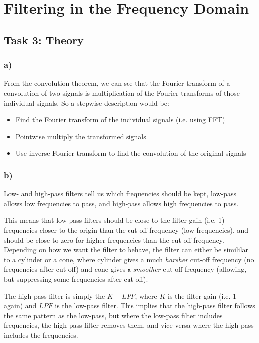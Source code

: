 \section{Filtering in the Frequency Domain}
\subsection{Task 3: Theory}
\subsubsection*{a)}
From the convolution theorem, we can see that the Fourier transform of a convolution of two signals is multiplication of the Fourier transforms of those individual signals. So a stepwise description would be: 
\begin{itemize}
    \item Find the Fourier transform of the individual signals (i.e. using FFT)
    \item Pointwise multiply the transformed signals
    \item Use inverse Fourier transform to find the convolution of the original signals
\end{itemize}

\subsubsection*{b)}
Low- and high-pass filters tell us which frequencies should be kept, low-pass allows low frequencies to pass, and high-pass allows high frequencies to pass. 

This means that low-pass filters should be close to the filter gain (i.e. 1) frequencies closer to the origin than the cut-off frequency (low frequencies), and should be close to zero for higher frequencies than the cut-off frequency. Depending on how we want the filter to behave, the filter can either be simililar to a cylinder or a cone, where cylinder gives a much \textit{harsher} cut-off frequency (no frequencies after cut-off) and cone gives a \textit{smoother} cut-off frequency (allowing, but suppressing some frequencies after cut-off). 

The high-pass filter is simply the $K - LPF$, where $K$ is the filter gain (i.e. 1 again) and $LPF$ is the low-pass filter. This implies that the high-pass filter follows the same pattern as the low-pass, but where the low-pass filter includes frequencies, the high-pass filter removes them, and vice versa where the high-pass includes the frequencies. 

